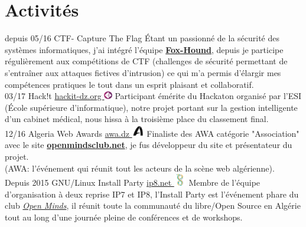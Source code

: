 \documentclass[]{friggeri-cv}
\begin{document}
\newpage
\section{Activités}
\begin{entrylist}
  \entry
    {depuis 05/16}
    {CTF- Capture The Flag}
    {}
    {Étant un passionné de la sécurité des systèmes informatiques, j'ai intégré l'équipe \href{https://web.facebook.com/F0xHo2Nd/}{\textbf{Fox-Hound}}, depuis je participe régulièrement aux compétitions de CTF (challenges de sécurité permettant de s’entraîner aux attaques fictives d’intrusion) ce qui m'a permis d'élargir mes compétences pratiques le tout dans un esprit plaisant et collaboratif.\\}
  \entry
    {03/17}
    {Hack!t}
    {\href{http://www.hackit-dz.org/}{hackit-dz.org  \includegraphics[width=10pt]{images/hackit.png}}}
    {Participant émérite du Hackaton organisé par l'ESI (École supérieure d'informatique), notre projet portant sur la gestion intelligente d'un cabinet médical, nous hissa à la troisième place du classement final.\\}
  \entry
    {12/16}
    {Algeria Web Awards}
    {\href{https://vote.awa.dz/detail/770/}{awa.dz \includegraphics[width=15pt]{images/awa.png}}}
    {Finaliste des AWA catégorie "Association" avec le site \href{http://www.openmindsclub.net/}{\textbf{openmindsclub.net}}, je fus développeur du site et présentateur du projet.\\
    (AWA: l’événement qui réunit tout les acteurs de la scène web algérienne).\\}
  \entry
    {Depuis 2015}
    {GNU/Linux Install Party}
    {\href{https://www.openmindsclub.net/ip8}{ip8.net \includegraphics[width=15pt]{images/favicon8.png}}}
    {Membre de l'équipe d'organisation à deux reprise IP7 et IP8, l'Install Party est l’événement phare du club \href{http://www.openmindsclub.net/}{\emph{Open Minds}}, il réunit toute la communauté du libre/Open Source en Algérie tout au long d'une journée pleine de conférences et de workshops.\\}
    
\end{entrylist}
\end{document}
